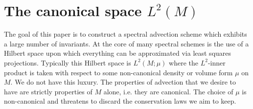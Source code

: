 \documentclass[final,leqno]{siamltex1213}
\begin{document}
%
%

\section{The canonical space $L^{2}(M)$}
\label{sec:half densities}
The goal of this paper is to construct a spectral advection scheme which exhibits a large number of invariants.
At the core of many spectral schemes is the use of a Hilbert space upon which everything can be approximated via least squares projections.
Typically this Hilbert space is $L^{2}(M ; \mu)$ where the $L^{2}$-inner product is taken with respect to some non-canonical density or volume form $\mu$ on $M$.
We do not have this luxury.
The properties of advection that we desire to have are strictly properties of $M$ alone, i.e. they are canonical.
The choice of $\mu$ is non-canonical and threatens to discard the conservation laws we aim to keep.
\end{document}
